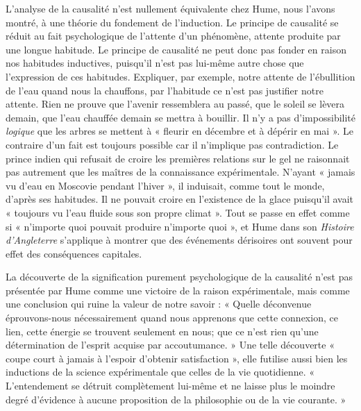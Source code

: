 L'analyse de la causalité n’est nullement équivalente
chez Hume, nous l’avons montré, à une théorie du fondement de 
l'induction. Le principe de causalité se réduit au
fait psychologique de l’attente d’un phénomène, attente
produite par une longue habitude. Le principe de causalité
ne peut donc pas fonder en raison nos habitudes inductives, puisqu'il 
n’est pas lui-même autre chose que l’expression de ces habitudes. 
Expliquer, par exemple, notre
attente de l’ébullition de l’eau quand nous la chauffons,
par l’habitude ce n’est pas justifier notre attente. Rien
ne prouve que l’avenir ressemblera au passé, que le soleil
se lèvera demain, que l’eau chauffée demain se mettra à
bouillir. Il n'y a pas d’impossibilité {\it logique} que les arbres
se mettent à « fleurir en décembre et à dépérir en mai ».
Le contraire d’un fait est toujours possible car il n’implique pas contradiction. 
Le prince indien qui refusait de
croire les premières relations sur le gel ne raisonnait pas
autrement que les maîtres de la connaissance expérimentale. 
N'ayant « jamais vu d’eau en Moscovie pendant
l’hiver », il induisait, comme tout le monde, d’après ses
habitudes. Il ne pouvait croire en l’existence de la glace
puisqu'il avait « toujours vu l’eau fluide sous son propre
climat ». Tout se passe en effet comme si « n’importe
quoi pouvait produire n’importe quoi », et Hume dans son
{\it Histoire d'Angleterre} s’applique à montrer que des événements 
dérisoires ont souvent pour effet des conséquences
capitales.

La découverte de la signification purement psychologique 
de la causalité n’est pas présentée par Hume comme
une victoire de la raison expérimentale, mais comme
une conclusion qui ruine la valeur de notre savoir : « Quelle
déconvenue éprouvons-nous nécessairement quand nous
apprenons que cette connexion, ce lien, cette énergie se
trouvent seulement en nous; que ce n’est rien qu’une détermination 
de l'esprit acquise par accoutumance. » Une
telle découverte « coupe court à jamais à l'espoir d’obtenir
satisfaction », elle futilise aussi bien les inductions de
la science expérimentale que celles de la vie quotidienne.
« L’entendement se détruit complètement lui-même et
ne laisse plus le moindre degré d’évidence à aucune proposition 
de la philosophie ou de la vie courante. »

